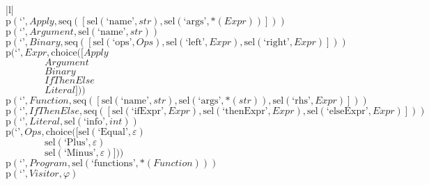 \footnotesize\begin{center}\begin{tabular}{|l|}\hline
{}
\\\hline
$\mathrm{p}(\text{`'},\mathit{Apply},\mathrm{seq}\left(\left[\mathrm{sel}\left(\text{`name'},str\right), \mathrm{sel}\left(\text{`args'},{*}\left(\mathit{Expr}\right)\right)\right]\right))$	\\
$\mathrm{p}(\text{`'},\mathit{Argument},\mathrm{sel}\left(\text{`name'},str\right))$	\\
$\mathrm{p}(\text{`'},\mathit{Binary},\mathrm{seq}\left(\left[\mathrm{sel}\left(\text{`ops'},\mathit{Ops}\right), \mathrm{sel}\left(\text{`left'},\mathit{Expr}\right), \mathrm{sel}\left(\text{`right'},\mathit{Expr}\right)\right]\right))$	\\
$\mathrm{p}(\text{`'},\mathit{Expr},\mathrm{choice}([\mathit{Apply}$\\$\qquad\qquad\mathit{Argument}$\\$\qquad\qquad\mathit{Binary}$\\$\qquad\qquad\mathit{IfThenElse}$\\$\qquad\qquad\mathit{Literal}]))$	\\
$\mathrm{p}(\text{`'},\mathit{Function},\mathrm{seq}\left(\left[\mathrm{sel}\left(\text{`name'},str\right), \mathrm{sel}\left(\text{`args'},{*}\left(str\right)\right), \mathrm{sel}\left(\text{`rhs'},\mathit{Expr}\right)\right]\right))$	\\
$\mathrm{p}(\text{`'},\mathit{IfThenElse},\mathrm{seq}\left(\left[\mathrm{sel}\left(\text{`ifExpr'},\mathit{Expr}\right), \mathrm{sel}\left(\text{`thenExpr'},\mathit{Expr}\right), \mathrm{sel}\left(\text{`elseExpr'},\mathit{Expr}\right)\right]\right))$	\\
$\mathrm{p}(\text{`'},\mathit{Literal},\mathrm{sel}\left(\text{`info'},int\right))$	\\
$\mathrm{p}(\text{`'},\mathit{Ops},\mathrm{choice}([\mathrm{sel}\left(\text{`Equal'},\varepsilon\right)$\\$\qquad\qquad\mathrm{sel}\left(\text{`Plus'},\varepsilon\right)$\\$\qquad\qquad\mathrm{sel}\left(\text{`Minus'},\varepsilon\right)]))$	\\
$\mathrm{p}(\text{`'},\mathit{Program},\mathrm{sel}\left(\text{`functions'},{*}\left(\mathit{Function}\right)\right))$	\\
$\mathrm{p}(\text{`'},\mathit{Visitor},\varphi)$	\\
\hline\end{tabular}\end{center}



